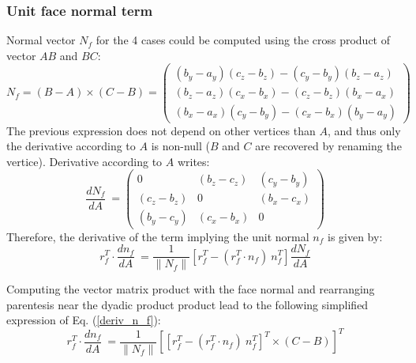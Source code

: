 \documentclass[11pt]{article}
\begin{document}
\subsubsection*{Unit face normal term}

Normal vector $N_f$ for the 4 cases could be computed using the cross product of vector $AB$ and $BC$:
\begin{equation}
N_f = (B-A) \times (C-B) = 
\begin{pmatrix}
(b_y-a_y)(c_z-b_z) - (c_y-b_y)(b_z-a_z)  \\
(b_z-a_z)(c_x-b_x) - (c_z-b_z)(b_x-a_x)  \\
(b_x-a_x)(c_y-b_y) - (c_x-b_x)(b_y-a_y) 
\end{pmatrix}
\end{equation}
The previous expression does not depend on other vertices than $A$, and thus only the derivative according to $A$ is non-null ($B$ and $C$ are recovered by renaming the vertice). Derivative according to $A$ writes:
\begin{equation}
\frac{d N_f}{dA}\ = \begin{pmatrix}
0 & (b_z-c_z) & (c_y-b_y) \\
(c_z-b_z) & 0 & (b_x-c_x) \\
(b_y-c_y) & (c_x-b_x) & 0
\end{pmatrix} 
\end{equation}
Therefore, the derivative of the term implying the unit normal $n_f$ is given by:
\begin{equation}
r_f^T\cdot \frac{d n_f}{dA}\ = 
 \frac{1}{\| N_f \|} \left[ r_f^T -  (r_f^T \cdot n_f)\ n_f^T \right] \frac{d N_f}{dA}
 \label{deriv_n_f}
\end{equation}

Computing the vector matrix product with the face normal and rearranging parentesis near the dyadic product product lead to the following simplified expression of Eq. (\ref{deriv_n_f}):
\begin{equation}
r_f^T\cdot \frac{d n_f}{dA}\ = 
 \frac{1}{\| N_f \|} \left[ \left[ r_f^T -  (r_f^T \cdot n_f)\ n_f^T \right]^T \times (C-B) \right]^T
\end{equation}
\end{document}
